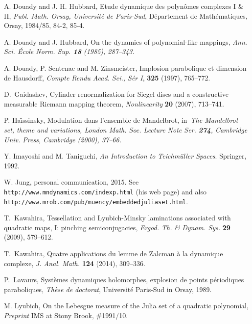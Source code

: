 \documentclass[12pt, reqno, a4paper]{amsart}
\theoremstyle{plain}
\theoremstyle{definition}
\begin{document}
\begin{thebibliography}{99}
A. Douady and J. H. Hubbard, 
Etude dynamique des polyn\^omes complexes I \& II, 
{\it Publ. Math. Orsay, Universit\'e de Paris-Sud}, 
D\'epartement de Math\'ematiques, Orsay, 
1984/85, 84-2, 85-4.


A. Douady and J. Hubbard, 
On the dynamics of polynomial-like mappings, \it
Ann. Sci. \'Ecole Norm. Sup. \rm {\bf 18} (1985), 287--343.


A. Douady, P. Sentenac and M. Zinsmeister,
Implosion parabolique et dimension de Hausdorff,
{\it Compte Rendu Acad. Sci., S\'er I}, 
{\bf 325} (1997), 765--772.


D.~Gaidashev, 
Cylinder renormalization for Siegel discs and 
a constructive measurable Riemann mapping theorem, 
{\it Nonlinearity} {\bf 20} (2007), 713--741.


P. Ha\"{\i}ssinsky, 
Modulation dans l'ensemble de Mandelbrot, 
in\it \ The Mandelbrot set, theme and variations\rm, London Math. Soc. Lecture 
Note Ser. {\bf 274}, Cambridge Univ. Press, Cambridge (2000), 37--66.


Y. Imayoshi and M. Taniguchi, 
{\it An Introduction to Teichm\" uller Spaces}. 
Springer, 1992.


W. Jung, personal communication, 2015. See 
\verb|http://www.mndynamics.com/indexp.html| (his web page)
and also
\verb|http://www.mrob.com/pub/muency/embeddedjuliaset.html|.


T.~Kawahira, 
Tessellation and Lyubich-Minsky laminations 
associated with quadratic maps, I: pinching semiconjugacies, 
{\it Ergod. Th. \& Dynam. Sys.} {\bf 29} (2009), 
579--612.


T.~Kawahira, 
Quatre applications du lemme de Zalcman \`a la dynamique complexe, 
{\it J. Anal. Math.} {\bf 124} (2014), 309--336.


P.~Lavaurs, 
Syst\`emes dynamiques holomorphes, 
explosion de points p\'eriodiques paraboliques,
{\it Th\`ese de doctorat}, Universit\'e Paris-Sud in Orsay, 1989.


M. Lyubich, 
On the Lebesgue measure of the Julia set of a quadratic
polynomial, {\it Preprint} IMS at Stony Brook, \#1991/10.




\end{thebibliography}
\end{document}
